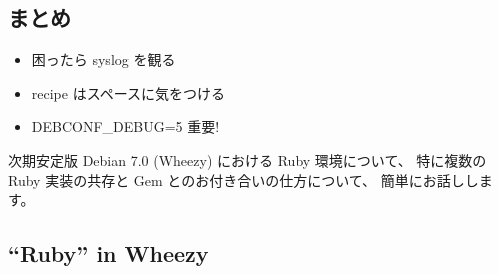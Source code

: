 \documentclass[mingoth,a4paper]{jsarticle}
\begin{document}
\subsection{まとめ}
\begin{itemize}
\item 困ったら syslog を観る
\item recipe はスペースに気をつける
\item DEBCONF\_DEBUG=5 重要!
\end{itemize}

\clearpage


\vspace{1em}

次期安定版 Debian 7.0 (Wheezy) における Ruby 環境について、%
特に複数の Ruby 実装の共存と Gem とのお付き合いの仕方について、
簡単にお話しします。

\subsection{``Ruby'' in Wheezy}
\end{document}
